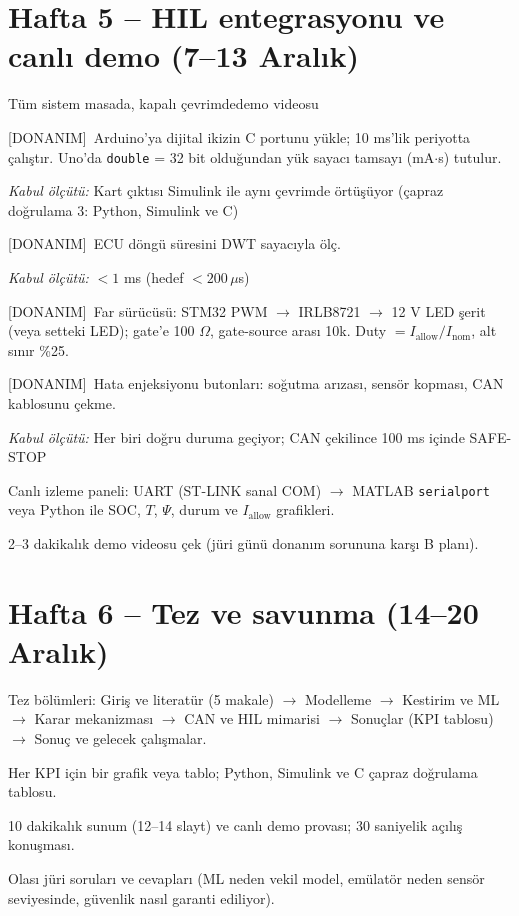 \documentclass[11pt,a4paper]{article}
\newcommand{\kabul}[1]{\par{\small\textit{Kabul ölçütü:} #1}}
\newcommand{\donanim}{\textcolor{uyari}{\small[DONANIM]}\ }
\begin{document}
\section{Hafta 5 -- HIL entegrasyonu ve canlı demo (7--13 Aralık)}
\begin{faz}{Tüm sistem masada, kapalı çevrimde}{demo videosu}
\end{faz}
\begin{gorev}
  \item \donanim Arduino'ya dijital ikizin C portunu yükle; 10 ms'lik periyotta çalıştır. Uno'da \texttt{double} = 32 bit olduğundan yük sayacı tamsayı (mA$\cdot$s) tutulur.
  \kabul{Kart çıktısı Simulink ile aynı çevrimde örtüşüyor (çapraz doğrulama 3: Python, Simulink ve C)}
  \item \donanim ECU döngü süresini DWT sayacıyla ölç.
  \kabul{$<1$ ms (hedef $<200\,\mu$s)}
  \item \donanim Far sürücüsü: STM32 PWM $\rightarrow$ IRLB8721 $\rightarrow$ 12 V LED şerit (veya setteki LED); gate'e 100 $\Omega$, gate-source arası 10k. Duty $= I_\text{allow}/I_\text{nom}$, alt sınır \%25.
  \item \donanim Hata enjeksiyonu butonları: soğutma arızası, sensör kopması, CAN kablosunu çekme.
  \kabul{Her biri doğru duruma geçiyor; CAN çekilince 100 ms içinde SAFE-STOP}
  \item Canlı izleme paneli: UART (ST-LINK sanal COM) $\rightarrow$ MATLAB \texttt{serialport} veya Python ile SOC, $T$, $\Psi$, durum ve $I_\text{allow}$ grafikleri.
  \item 2--3 dakikalık demo videosu çek (jüri günü donanım sorununa karşı B planı).
\end{gorev}

\section{Hafta 6 -- Tez ve savunma (14--20 Aralık)}
\begin{gorev}
  \item Tez bölümleri: Giriş ve literatür (5 makale) $\rightarrow$ Modelleme $\rightarrow$ Kestirim ve ML $\rightarrow$ Karar mekanizması $\rightarrow$ CAN ve HIL mimarisi $\rightarrow$ Sonuçlar (KPI tablosu) $\rightarrow$ Sonuç ve gelecek çalışmalar.
  \item Her KPI için bir grafik veya tablo; Python, Simulink ve C çapraz doğrulama tablosu.
  \item 10 dakikalık sunum (12--14 slayt) ve canlı demo provası; 30 saniyelik açılış konuşması.
  \item Olası jüri soruları ve cevapları (ML neden vekil model, emülatör neden sensör seviyesinde, güvenlik nasıl garanti ediliyor).
\end{gorev}
\end{document}
